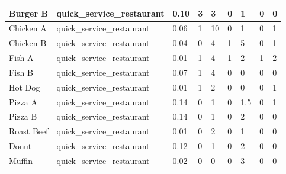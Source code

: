 \begin{table}[]
\begin{tabular}{|l|l|l|l|l|l|l|l|l|}
    Burger B                 & quick\_service\_restaurant      & 0.10                               & 3                & 3              & 0                & 1             & 0              & 0                \\ \hline
    Chicken A                & quick\_service\_restaurant      & 0.06                               & 1                & 10             & 0                & 1             & 0              & 1                \\ \hline
    Chicken B                & quick\_service\_restaurant      & 0.04                               & 0                & 4              & 1                & 5             & 0              & 1                \\ \hline
    Fish A                   & quick\_service\_restaurant      & 0.01                               & 1                & 4              & 1                & 2             & 1              & 2                \\ \hline
    Fish B                   & quick\_service\_restaurant      & 0.07                               & 1                & 4              & 0                & 0             & 0              & 0                \\ \hline
    Hot Dog                  & quick\_service\_restaurant      & 0.01                               & 1                & 2              & 0                & 0             & 0              & 1                \\ \hline
    Pizza A                  & quick\_service\_restaurant      & 0.14                               & 0                & 1              & 0                & 1.5           & 0              & 1                \\ \hline
    Pizza B                  & quick\_service\_restaurant      & 0.14                               & 0                & 1              & 0                & 2             & 0              & 0                \\ \hline
    Roast Beef               & quick\_service\_restaurant      & 0.01                               & 0                & 2              & 0                & 1             & 0              & 0                \\ \hline
    Donut                    & quick\_service\_restaurant      & 0.12                               & 0                & 1              & 0                & 2             & 0              & 0                \\ \hline
    Muffin                   & quick\_service\_restaurant      & 0.02                               & 0                & 0              & 0                & 3             & 0              & 0                \\ \hline

\end{tabular}
\end{table}
